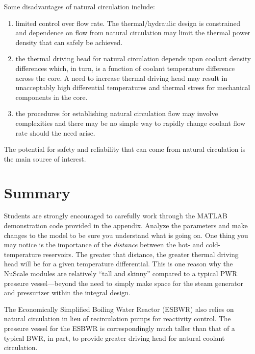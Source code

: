 Some disadvantages of natural circulation include:
\begin{enumerate}
\item limited control over flow rate.  The thermal/hydraulic design is constrained and dependence on flow from natural circulation may limit the thermal power density that can safely be achieved.
\item the thermal driving head for natural circulation depends upon coolant density differences which, in turn, is a function of coolant temperature difference across the core.  A need to increase thermal driving head may result in unacceptably high differential temperatures and thermal stress for mechanical components in the core.
\item the procedures for establishing natural circulation flow may involve complexities and there may be no simple way to rapidly change coolant flow rate should the need arise.
\end{enumerate}

The potential for safety and reliability that can come from natural circulation is the main source of interest.

\section{Summary}
Students are strongly encouraged to carefully work through the MATLAB demonstration code provided in the appendix.  Analyze the parameters and make changes to the model to be sure you understand what is going on.  One thing you may notice is the importance of the \emph{distance} between the hot- and cold-temperature reservoirs.  The greater that distance, the greater thermal driving head will be for a given temperature differential.  This is one reason why the NuScale modules are relatively ``tall and skinny'' compared to a typical PWR pressure vessel---beyond the need to simply make space for the steam generator and pressurizer within the integral design.  

The Economically Simplified Boiling Water Reactor (ESBWR) also relies on natural circulation in lieu of recirculation pumps for reactivity control.\cite{hinds2006next}  The pressure vessel for the ESBWR is correspondingly much taller than that of a typical BWR, in part, to provide greater driving head for natural coolant circulation. 


